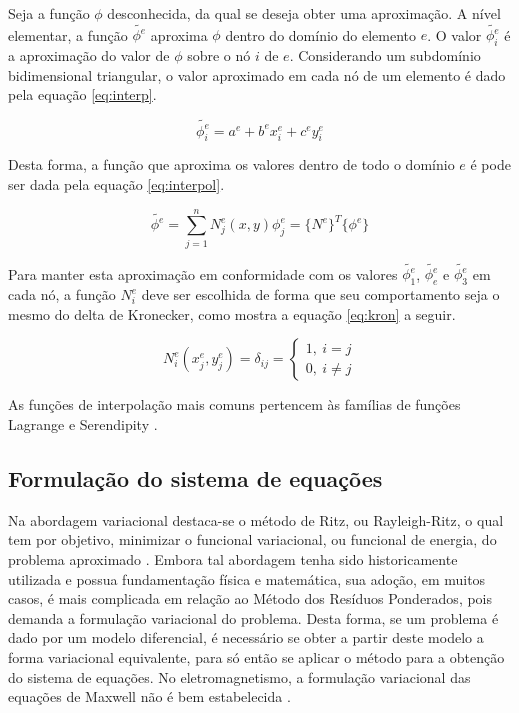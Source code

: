 \documentclass[
    12pt,               %
    openright,          %
    oneside,
    a4paper,            %
    english,            %
    french,             %
    spanish,            %
    brazil              %
    ]{abntex2}
\begin{document}
Seja a função $\phi$ desconhecida, da qual se deseja obter uma aproximação. A nível elementar, a função $\tilde{\phi^e}$ aproxima $\phi$ dentro do domínio do elemento $e$. O valor $\tilde{\phi^{e}_i}$  é a aproximação do valor de $\phi$ sobre o nó $i$ de $e$. Considerando um subdomínio bidimensional triangular, o valor aproximado em cada nó de um elemento é dado pela equação \ref{eq:interp}.

\begin{equation}
\label{eq:interp}
\tilde{\phi^e_i} = a^e + b^e x^e_i + c^e y^e_i
\end{equation}

Desta forma, a função que aproxima os valores dentro de todo o domínio $e$ é pode ser dada pela equação \ref{eq:interpol}.

\begin{equation}
\label{eq:interpol}
\tilde{\phi^e} = \sum_{j=1}^{n}{N_j^e (x, y) \phi_j^e} = 
\{N^e\}^T \{\phi^e\}
\end{equation}

Para manter esta aproximação em conformidade com os valores $\tilde{\phi^e_1}$, $\tilde{\phi^e_e}$ e $\tilde{\phi^e_3}$ em cada nó, a função $N_i^e$ deve ser escolhida de forma que seu comportamento seja o mesmo do delta de Kronecker, como mostra a equação \ref{eq:kron} a seguir.

\begin{equation}
\label{eq:kron}
N_i^e(x^e_j, y^e_j) = \delta_{ij} = \begin{cases}
1, \ i = j\\
0, \ i \neq j
\end{cases}
\end{equation}

As funções de interpolação mais comuns pertencem às famílias de funções Lagrange e Serendipity \cite{zien, volakis}.

\subsection{Formulação do sistema de equações}
Na abordagem variacional destaca-se o método de Ritz, ou Rayleigh-Ritz, o qual tem por objetivo, minimizar o funcional variacional, ou funcional de energia, do problema aproximado \cite{volakis}. Embora tal abordagem tenha sido historicamente utilizada e possua fundamentação física e matemática, sua adoção, em muitos casos, é mais complicada em relação ao Método dos Resíduos Ponderados, pois demanda a formulação variacional do problema. Desta forma, se um problema é dado por um modelo diferencial, é necessário se obter a partir deste modelo a forma variacional equivalente, para só então se aplicar o método para a obtenção do sistema de equações. No eletromagnetismo, a formulação variacional das equações de Maxwell não é bem estabelecida \cite{jin}.
\end{document}
